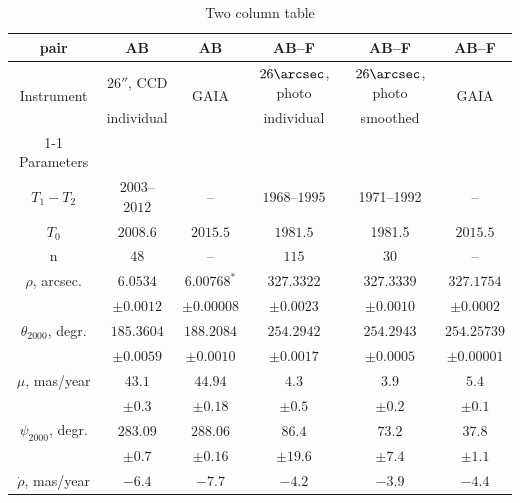 \documentclass[
 aps, pra,
 amsmath,amssymb,
 11pt,
 final,
tightenlines,
 twoside,
 twocolumn,
 nofloats,
nofootinbib,
 superscriptaddress,
showkeys,
showkeywords,
 ]
{revtex4-2}
\begin{document}
\begin{table}
\caption {Two column table} \label{pvd}
\medskip
\begin{tabular}{c|c|c|c|c|c}
\hline
pair                           & AB             & AB                    & AB--F             & AB--F              & AB--F \\
\hline
\multirow{2}{*}{Instrument}    & $26''$, CCD    & \multirow{2}{*}{GAIA} & $26\arcsec$, photo & $26\arcsec$, photo  & \multirow{2}{*}{GAIA} \\
                               & individual &                       & individual    & smoothed         &    \\
\cline{1-1}
Parameters                      &                &                       &                   &                    &    \\
\hline
$T_1-T_2$                        & $2003$--$2012$ & --           & $1968$--$1995$ & 1971--1992  & -- \\
$T_0$                            & $2008.6$       & $2015.5$     & $1981.5$       & 1981.5      & $2015.5$ \\
  n                              & $48$           & --           & $115$          & 30          & -- \\
 \hline
$\rho$, arcsec.                & $6.0534$       & $6.00768^*$  & $327.3322$     & $327.3339$  & $327.1754$ \\
                                 & $\pm0.0012$    & $\pm0.00008$ & $\pm0.0023$    & $\pm0.0010$ & $\pm0.0002$ \\
\hline
$\theta_{2000}$, degr.         & $185.3604$     & $188.2084$   & $254.2942$     & $254.2943$  & $254.25739$ \\
                                 & $\pm0.0059$    & $\pm0.0010$  & $\pm0.0017$    & $\pm0.0005$ & $\pm0.00001$ \\
\hline
$\mu$, mas/year                   & $43.1$         & $44.94$      & $4.3$          & $3.9$       & $5.4$ \\
                                 & $\pm0.3$       & $\pm0.18$    & $\pm0.5$       & $\pm0.2$    & $\pm0.1$ \\
\hline
$\psi_{2000}$, degr.             & $283.09$       & $288.06$     & $86.4$         & $73.2$      & $37.8$ \\
                                 & $\pm0.7$       & $\pm0.16$    & $\pm19.6$      & $\pm7.4$    & $\pm1.1$ \\
\hline
$\dot{\rho}$, mas/year            & $-6.4$         & $-7.7$       & $-4.2$         & $-3.9$      & $-4.4$ \\

\end{tabular}
\end{table}
\end{document}
